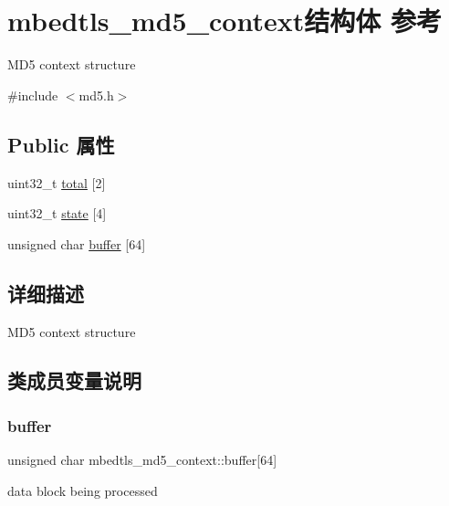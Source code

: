 \hypertarget{structmbedtls__md5__context}{}\section{mbedtls\+\_\+md5\+\_\+context结构体 参考}
\label{structmbedtls__md5__context}


M\+D5 context structure  




{\ttfamily \#include $<$md5.\+h$>$}

\subsection*{Public 属性}
\begin{DoxyCompactItemize}
\item 
uint32\+\_\+t \hyperlink{structmbedtls__md5__context_a69e02fc353b932fe9f58fcae64506c6e}{total} \mbox{[}2\mbox{]}
\item 
uint32\+\_\+t \hyperlink{structmbedtls__md5__context_a17e9e7e1ab79b648e787969ee5b73929}{state} \mbox{[}4\mbox{]}
\item 
unsigned char \hyperlink{structmbedtls__md5__context_a456c4c1c0f77e12f5091e7fb7ecbb476}{buffer} \mbox{[}64\mbox{]}
\end{DoxyCompactItemize}


\subsection{详细描述}
M\+D5 context structure 

\subsection{类成员变量说明}
\mbox{\label{structmbedtls__md5__context_a456c4c1c0f77e12f5091e7fb7ecbb476}} 
\subsubsection{\texorpdfstring{buffer}{buffer}}
{\footnotesize\ttfamily unsigned char mbedtls\+\_\+md5\+\_\+context\+::buffer\mbox{[}64\mbox{]}}

data block being processed \mbox{\label{structmbedtls__md5__context_a17e9e7e1ab79b648e787969ee5b73929}} 
